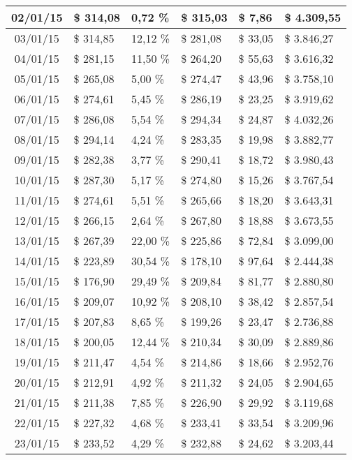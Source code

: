 \begin{small}
\begin{longtable}{|c|l|l|l|l|l|}
02/01/15 & \$ 314,08 & 0,72 \% & \$ 315,03 & \$ 7,86 & \$ 4.309,55 \\ \hline
03/01/15 & \$ 314,85 & 12,12 \% & \$ 281,08 & \$ 33,05 & \$ 3.846,27 \\ \hline
04/01/15 & \$ 281,15 & 11,50 \% & \$ 264,20 & \$ 55,63 & \$ 3.616,32 \\ \hline
05/01/15 & \$ 265,08 & 5,00 \% & \$ 274,47 & \$ 43,96 & \$ 3.758,10 \\ \hline
06/01/15 & \$ 274,61 & 5,45 \% & \$ 286,19 & \$ 23,25 & \$ 3.919,62 \\ \hline
07/01/15 & \$ 286,08 & 5,54 \% & \$ 294,34 & \$ 24,87 & \$ 4.032,26 \\ \hline
08/01/15 & \$ 294,14 & 4,24 \% & \$ 283,35 & \$ 19,98 & \$ 3.882,77 \\ \hline
09/01/15 & \$ 282,38 & 3,77 \% & \$ 290,41 & \$ 18,72 & \$ 3.980,43 \\ \hline
10/01/15 & \$ 287,30 & 5,17 \% & \$ 274,80 & \$ 15,26 & \$ 3.767,54 \\ \hline
11/01/15 & \$ 274,61 & 5,51 \% & \$ 265,66 & \$ 18,20 & \$ 3.643,31 \\ \hline
12/01/15 & \$ 266,15 & 2,64 \% & \$ 267,80 & \$ 18,88 & \$ 3.673,55 \\ \hline
13/01/15 & \$ 267,39 & 22,00 \% & \$ 225,86 & \$ 72,84 & \$ 3.099,00 \\ \hline
14/01/15 & \$ 223,89 & 30,54 \% & \$ 178,10 & \$ 97,64 & \$ 2.444,38 \\ \hline
15/01/15 & \$ 176,90 & 29,49 \% & \$ 209,84 & \$ 81,77 & \$ 2.880,80 \\ \hline
16/01/15 & \$ 209,07 & 10,92 \% & \$ 208,10 & \$ 38,42 & \$ 2.857,54 \\ \hline
17/01/15 & \$ 207,83 & 8,65 \% & \$ 199,26 & \$ 23,47 & \$ 2.736,88 \\ \hline
18/01/15 & \$ 200,05 & 12,44 \% & \$ 210,34 & \$ 30,09 & \$ 2.889,86 \\ \hline
19/01/15 & \$ 211,47 & 4,54 \% & \$ 214,86 & \$ 18,66 & \$ 2.952,76 \\ \hline
20/01/15 & \$ 212,91 & 4,92 \% & \$ 211,32 & \$ 24,05 & \$ 2.904,65 \\ \hline
21/01/15 & \$ 211,38 & 7,85 \% & \$ 226,90 & \$ 29,92 & \$ 3.119,68 \\ \hline
22/01/15 & \$ 227,32 & 4,68 \% & \$ 233,41 & \$ 33,54 & \$ 3.209,96 \\ \hline
23/01/15 & \$ 233,52 & 4,29 \% & \$ 232,88 & \$ 24,62 & \$ 3.203,44 \\ \hline

\end{longtable}
\end{small}
